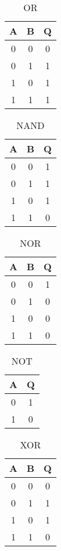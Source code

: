 \documentclass[12pt, letterpaper, titlepage]{article}
\begin{document}
\begin{table}[h!]
\centering\caption{OR}
\begin{tabular}{c c| c}

A & B & Q\\
\hline
0 & 0 & 0\\
0 & 1 & 1\\
1 & 0 & 1\\
1 & 1 & 1\\

\end{tabular}
\end{table}
\begin{table}[h!]
\centering\caption{NAND}
\begin{tabular}{c c| c}

A & B & Q\\
\hline
0 & 0 & 1\\
0 & 1 & 1\\
1 & 0 & 1\\
1 & 1 & 0\\

\end{tabular}
\end{table}
\begin{table}[h!]
\centering\caption{NOR}
\begin{tabular}{c c| c}

A & B & Q\\
\hline
0 & 0 & 1\\
0 & 1 & 0\\
1 & 0 & 0\\
1 & 1 & 0\\

\end{tabular}
\end{table}
\begin{table}[h!]
\centering\caption{NOT}
\begin{tabular}{c| c}

A & Q\\
\hline
0 & 1\\
1 & 0\\


\end{tabular}
\end{table}
\begin{table}[h!]
\centering\caption{XOR}
\begin{tabular}{c c| c}

A & B & Q\\
\hline
0 & 0 & 0\\
0 & 1 & 1\\
1 & 0 & 1\\
1 & 1 & 0\\

\end{tabular}
\end{table}
\end{document}
